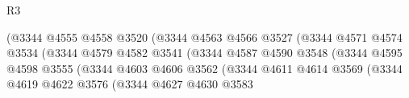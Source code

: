 \begin{lexlean}{R3}
\begin{coremodule}
                                                  (@3344
                                                    @4555
                                                    @4558
                                                    @3520
                                                    (@3344
                                                      @4563
                                                      @4566
                                                      @3527
                                                      (@3344
                                                        @4571
                                                        @4574
                                                        @3534
                                                        (@3344
                                                          @4579
                                                          @4582
                                                          @3541
                                                          (@3344
                                                            @4587
                                                            @4590
                                                            @3548
                                                            (@3344
                                                              @4595
                                                              @4598
                                                              @3555
                                                              (@3344
                                                                @4603
                                                                @4606
                                                                @3562
                                                                (@3344
                                                                  @4611
                                                                  @4614
                                                                  @3569
                                                                  (@3344
                                                                    @4619
                                                                    @4622
                                                                    @3576
                                                                    (@3344
                                                                      @4627
                                                                      @4630
                                                                      @3583

\end{coremodule}
\end{lexlean}
